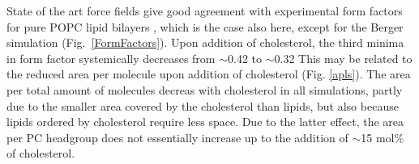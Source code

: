 \documentclass[aps,prl,superscriptaddress,twocolumn]{revtex4}
\begin{document}
State of the art force fields give good agreement with experimental form factors for
pure POPC lipid bilayers \cite{??}, which is the case also here, except for the Berger
simulation (Fig.~\ref{FormFactors}).
Upon addition of cholesterol, the third minima in form factor systemically decreases from $\sim$0.42 to $\sim$0.32
This may be related to the reduced area per molecule upon addition of cholesterol (Fig. \ref{apls}).
The area per total amount of molecules decreas with cholesterol in all simulations, partly
due to the smaller area covered by the cholesterol than lipids, but also because
lipids ordered by cholesterol require less space. Due to the latter effect,
the area per PC headgroup does not essentially increase up to the addition of
$\sim$15 mol\% of cholesterol. 
\end{document}
